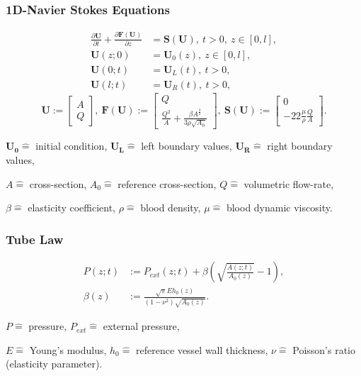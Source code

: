 \documentclass{beamer}
\begin{document}
\begin{frame}
	\frametitle{1D-Navier Stokes Equations}
	\begin{equation}
		\begin{aligned}
			\frac{\partial \mathbf{U}}{\partial t} + \frac{\partial \mathbf{F} \left(
			\mathbf{U} \right)}{\partial z} &= \mathbf{S} \left( \mathbf{U} \right), \ t>0, \
			z \in \left[ 0,l \right], \\
			\mathbf{U} \left( z;0 \right) &= \mathbf{U}_0 \left( z \right), \ z \in \left[ 0,l \right], \\
			\mathbf{U} \left( 0;t \right) &= \mathbf{U}_L \left( t \right), \ t>0,\\
			\mathbf{U} \left( l;t \right) &= \mathbf{U}_R \left( t \right), \ t>0,
		\end{aligned} \label{eq:1deqs3}
	\end{equation}
	\begin{equation}
		\mathbf{U} :=
		\begin{bmatrix}
			A \\
			Q
		\end{bmatrix}, \ 
		\mathbf{F} \left( \mathbf{U} \right) :=
		\begin{bmatrix}
			Q \\
			\frac{Q^2}{A} + \frac{\beta A^{\frac{3}{2}}}{3\rho\sqrt{A_0}}
		\end{bmatrix}, \ 
		\mathbf{S} \left( \mathbf{U} \right) :=
		\begin{bmatrix}
			0 \\
			-22\frac{\mu}{\rho}\frac{Q}{A}
		\end{bmatrix}.
	\end{equation}

	\vfill

	{\tiny \centering 
		$\mathbf{U_0} \hat{=}$ initial condition, 
		$\mathbf{U_L} \hat{=}$ left boundary values,
		$\mathbf{U_R} \hat{=}$ right boundary values,

		$A \hat{=}$ cross-section,
		$A_0 \hat{=}$ reference cross-section,
		$Q \hat{=}$ volumetric flow-rate,

		$\beta \hat{=}$ elasticity coefficient,
		$\rho \hat{=}$ blood density,
		$\mu \hat{=}$ blood dynamic viscosity. 
	\par}


\end{frame}

\begin{frame}
	\frametitle{Tube Law}
	\begin{align}
		P(z;t) &:= P_{ext}(z;t) + \beta \left( \sqrt{\frac{A(z;t)}{A_0(z)}}-1 \right),      \label{eq:p_tot}\\
		\beta(z) &:=  \frac{\sqrt{\pi} E h_0(z)}{(1-\nu^2) \sqrt{A_0(z)}}.
	\end{align}

	\vfill

	{\tiny \centering 
		$P \hat{=}$ pressure,
		$P_{ext} \hat{=}$ external pressure,

		$E \hat{=}$ Young's modulus,
		$h_0 \hat{=}$ reference vessel wall thickness,
		$\nu \hat{=}$ Poisson's ratio (elasticity parameter). 
	\par}

\end{frame}
\end{document}
